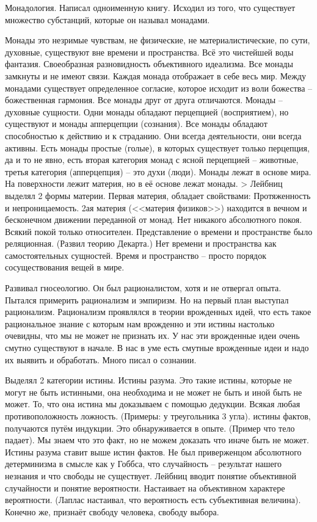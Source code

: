 Монадология. Написал одноименную книгу. Исходил из того, что существует множество субстанций, которые он называл монадами.

    Монады это незримые чувствам, не физические, не материалистические, по сути, духовные, существуют вне времени и пространства. Всё это чистейшей воды фантазия. Своеобразная разновидность объективного идеализма. Все монады замкнуты и не имеют связи. Каждая монада отображает в себе весь мир. Между монадами существует определенное согласие, которое исходит из воли божества – божественная гармония. Все монады друг от друга отличаются. Монады – духовные сущности. Одни монады обладают перцепцией (восприятием), но существуют и монады апперцепции (сознания). Все монады обладают способностью к действию и к страданию. Они всегда деятельности, они всегда активны. Есть монады простые (голые), в которых существует только перцепция, да и то не явно, есть вторая категория монад с ясной перцепцией – животные, третья категория (апперцепция) – это духи (люди). Монады лежат в основе мира. На поверхности лежит материя, но в её основе лежат монады. > Лейбниц выделял 2 формы материи. Первая материя, обладает свойствами: Протяженность и непроницаемость. 2ая материя (<<материя физиков>>) находится в вечном и бесконечном движении переданной от монад. Нет никакого абсолютного покоя. Всякий покой только относителен. Представление о времени и пространстве было реляционная. (Развил теорию Декарта.) Нет времени и пространства как самостоятельных сущностей. Время и пространство – просто порядок сосуществования вещей в мире.

Развивал гносеологию. Он был рационалистом, хотя и не отвергал опыта. Пытался примерить рационализм и эмпиризм. Но на первый план выступал рационализм. Рационализм проявлялся в теории врожденных идей, что есть такое рациональное знание с которым нам врожденно и эти истины настолько очевидны, что мы не может не признать их. У нас эти врожденные идеи очень смутно существуют в начале. В нас в уме есть смутные врожденные идеи и надо их выявить и обработать. Много писал о сознании.

    Выделял 2 категории истины. Истины разума. Это такие истины, которые не могут не быть истинными, она необходима и не может не быть и иной быть не может. То, что она истина мы доказываем с помощью дедукции. Всякая любая противоположность ложность. (Примеры: у треугольника 3 угла). истины фактов, получаются путём индукции. Это обнаруживается в опыте. (Пример что тело падает). Мы знаем что это факт, но не можем доказать что иначе быть не может. Истины разума ставит выше истин фактов. Не был приверженцом абсолютного детерминизма в смысле как у Гоббса, что случайность – результат нашего незнания и что свободы не существует. Лейбниц вводит понятие объективной случайности и понятие вероятности. Настаивает на объективном характере вероятности. (Лаплас настаивал, что вероятность есть субъективная величина). Конечно же, признаёт свободу человека, свободу выбора.

